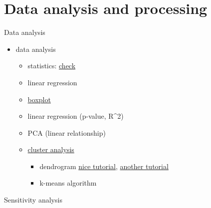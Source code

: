 \documentclass[8pt,ignorenonframetext,]{beamer}
\providecommand{\tightlist}{%
  \setlength{\itemsep}{0pt}\setlength{\parskip}{0pt}}
\begin{document}
\section{Data analysis and
processing}\label{data-analysis-and-processing}

\begin{frame}{Data analysis}

\begin{itemize}
\tightlist
\item
  data analysis

  \begin{itemize}
  \tightlist
  \item
    statistics:
    \href{https://www.hydrology.uni-kiel.de/de/mitarbeiter/Statistics}{check}
  \item
    linear regression
  \item
    \href{https://cran.r-project.org/web/packages/beanplot/vignettes/beanplot.pdf}{boxplot}
  \item
    linear regression (p-value, R\^{}2)
  \item
    PCA (linear relationship)
  \item
    \href{http://www.sthda.com/english/articles/25-cluster-analysis-in-r-practical-guide/111-types-of-clustering-methods-overview-and-quick-start-r-code/}{cluster
    analysis}

    \begin{itemize}
    \tightlist
    \item
      dendrogram
      \href{http://www.sthda.com/english/wiki/beautiful-dendrogram-visualizations-in-r-5-must-known-methods-unsupervised-machine-learning}{nice
      tutorial}, \href{https://rpubs.com/gaston/dendrograms}{another
      tutorial}
    \item
      k-means algorithm
    \end{itemize}
  \end{itemize}
\end{itemize}

\end{frame}

\begin{frame}{Sensitivity analysis}

\end{frame}
\end{document}
